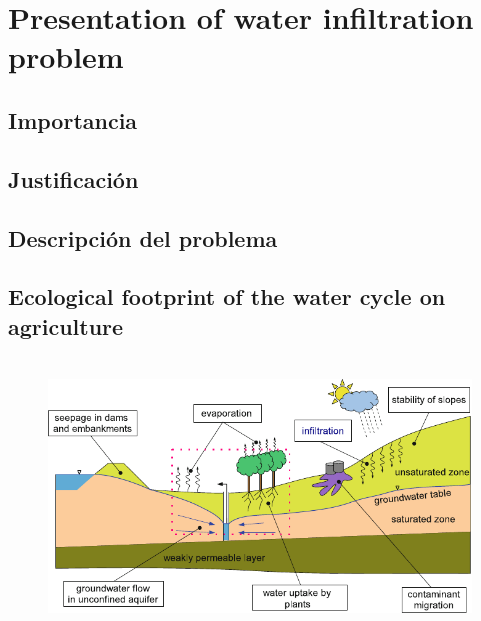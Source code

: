 \section{Presentation of water infiltration problem}
\subsection{Importancia}
\subsection{Justificación}
\subsection{Descripción del problema}
\subsection{Ecological footprint of the water cycle on agriculture}

\begin{frame}
	\frametitle{\subsecname}
	\begin{figure}[ht!]
		\centering
		\includegraphics[height=7cm]{contamination}
	\end{figure}
\end{frame}



